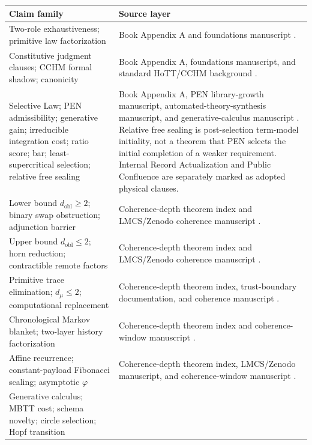 \documentclass[11pt]{article}
\theoremstyle{plain}
\theoremstyle{definition}
\theoremstyle{remark}
\begin{document}
\begin{longtable}{@{}>{\raggedright\arraybackslash}p{}>{\raggedright\arraybackslash}p{}@{}}
\toprule
Claim family & Source layer \\
\midrule
\endhead
Two-role exhaustiveness; primitive law factorization
& Book Appendix A and foundations manuscript \cite{lande-book-appendices,lande-foundations}. \\
Constitutive judgment clauses; CCHM formal shadow; canonicity
& Book Appendix A, foundations manuscript, and standard HoTT/CCHM background \cite{lande-book-appendices,lande-foundations,hottbook,cohen-cubical}. \\
Selective Law; PEN admissibility; generative gain; irreducible integration cost; ratio score; bar; least-supercritical selection; relative free sealing
& Book Appendix A, PEN library-growth manuscript, automated-theory-synthesis manuscript, and generative-calculus manuscript \cite{lande-book-appendices,lande-pen,lande-automated,lande-generative}. Relative free sealing is post-selection term-model initiality, not a theorem that PEN selects the initial completion of a weaker requirement. Internal Record Actualization and Public Confluence are separately marked as adopted physical clauses. \\
Lower bound \(d_{\mathrm{obl}}\ge2\); binary swap obstruction; adjunction barrier
& Coherence-depth theorem index and LMCS/Zenodo coherence manuscript \cite{lande-coherence-artifact,lmcs-coherence}. \\
Upper bound \(d_{\mathrm{obl}}\le2\); horn reduction; contractible remote factors
& Coherence-depth theorem index and LMCS/Zenodo coherence manuscript \cite{lande-coherence-artifact,lmcs-coherence}. \\
Primitive trace elimination; \(d_\mu\le2\); computational replacement
& Coherence-depth theorem index, trust-boundary documentation, and coherence manuscript \cite{lande-coherence-artifact,lande-coherence}. \\
Chronological Markov blanket; two-layer history factorization
& Coherence-depth theorem index and coherence-window manuscript \cite{lande-coherence-artifact,lande-coherence}. \\
Affine recurrence; constant-payload Fibonacci scaling; asymptotic \(\varphi\)
& Coherence-depth theorem index, LMCS/Zenodo manuscript, and coherence-window manuscript \cite{lande-coherence-artifact,lmcs-coherence,lande-coherence}. \\
Generative calculus; MBTT cost; schema novelty; circle selection; Hopf transition

\end{longtable}
\end{document}
